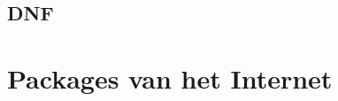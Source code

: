 \documentclass[a4paper,12pt,twoside,openright,titlepage]{book}
\begin{document}
\subsection{DNF}

\section{Packages van het Internet}

\end{document}
